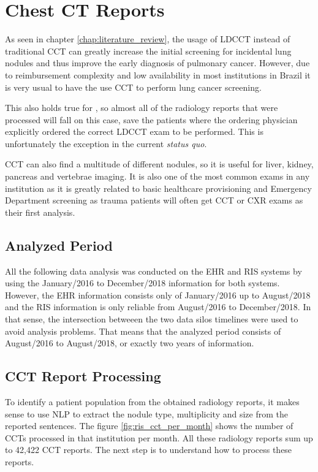 \section{Chest CT Reports} 

As seen in chapter \ref{chap:literature_review}, the usage of LDCCT instead of traditional CCT can greatly increase the initial screening for incidental lung nodules and thus improve the early diagnosis of pulmonary cancer. However, due to reimbursement complexity and low availability in most institutions in Brazil it is very usual to have the use CCT to perform lung cancer screening.

This also holds true for \nomeHsl{}, so almost all of the radiology reports that were processed will fall on this case, save the patients where the ordering physician explicitly ordered the correct LDCCT exam to be performed. This is unfortunately the exception in the current \emph{status quo}.

CCT can also find a multitude of different nodules, so it is useful for liver, kidney, pancreas and vertebrae imaging. It is also one of the most common exams in any institution as it is greatly related to basic healthcare provisioning and Emergency Department screening as trauma patients will often get CCT or CXR exams as their first analysis.

\subsection{Analyzed Period}

All the following data analysis was conducted on the EHR and RIS systems by using the January/2016 to December/2018 information for both systems. However, the EHR information consists only of January/2016 up to August/2018 and the RIS information is only reliable from August/2016 to December/2018. In that sense, the intersection betweeen the two data silos timelines were used to avoid analysis problems. That means that the analyzed period consists of August/2016 to August/2018, or exactly two years of information. 

\subsection{CCT Report Processing}

To identify a patient population from the obtained radiology reports, it makes sense to use NLP to extract the nodule type, multiplicity and size from the reported sentences. The figure \ref{fig:ris_cct_per_month} shows the number of CCTs processed in that institution per month. All these radiology reports sum up to 42,422 CCT reports. The next step is to understand how to process these reports.


